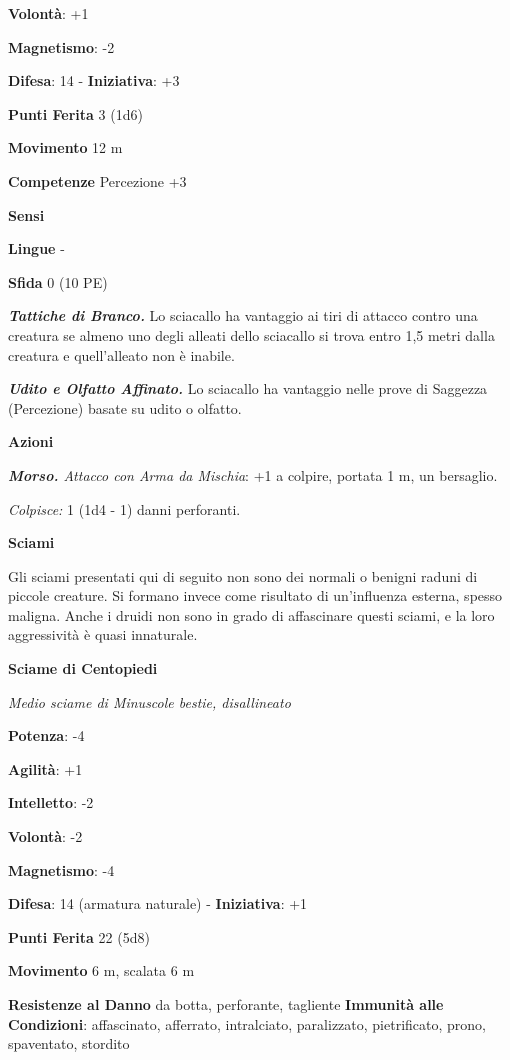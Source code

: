 \begin{multicols}{2}
\textbf{Volontà}: +1

\textbf{Magnetismo}: -2

\textbf{Difesa}: 14 - \textbf{Iniziativa}: +3

\textbf{Punti Ferita} 3 (1d6)

\textbf{Movimento} 12 m

\textbf{Competenze} Percezione +3

\textbf{Sensi} 

\textbf{Lingue} -

\textbf{Sfida} 0 (10 PE)\smallskip

\emph{\textbf{Tattiche di Branco.}} Lo sciacallo ha vantaggio ai tiri di
attacco contro una creatura se almeno uno degli alleati dello sciacallo
si trova entro 1,5 metri dalla creatura e quell'alleato non è inabile.

\emph{\textbf{Udito e Olfatto Affinato.}} Lo sciacallo ha vantaggio
nelle prove di Saggezza (Percezione) basate su udito o olfatto.

\smallskip\textbf{Azioni}

\emph{\textbf{Morso.} Attacco con Arma da Mischia}: +1 a colpire,
portata 1 m, un bersaglio.

\emph{Colpisce:} 1 (1d4 - 1) danni perforanti.

\textbf{Sciami}

Gli sciami presentati qui di seguito non sono dei normali o benigni
raduni di piccole creature. Si formano invece come risultato di
un'influenza esterna, spesso maligna. Anche i druidi non sono in grado
di affascinare questi sciami, e la loro aggressività è quasi innaturale.

\textbf{Sciame di Centopiedi}

\emph{Medio sciame di Minuscole bestie, disallineato}

\textbf{Potenza}: -4

\textbf{Agilità}: +1

\textbf{Intelletto}: -2

\textbf{Volontà}: -2

\textbf{Magnetismo}: -4

\textbf{Difesa}: 14 (armatura naturale) - \textbf{Iniziativa}: +1

\textbf{Punti Ferita} 22 (5d8)

\textbf{Movimento} 6 m, scalata 6 m

\textbf{Resistenze al Danno} da botta, perforante, tagliente
\textbf{Immunità alle Condizioni}: affascinato, afferrato, intralciato,
paralizzato, pietrificato, prono, spaventato, stordito


\end{multicols}

